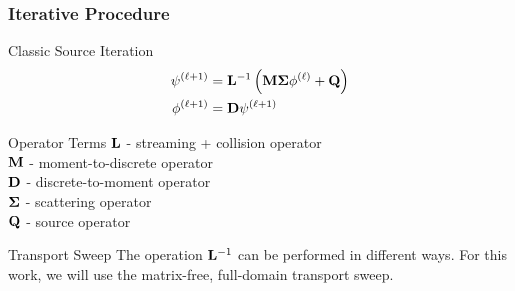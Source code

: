\documentclass[compress,10pt]{beamer}
\begin{document}
\typeout{***********************************************************************************}
\begin{frame}[t]\frametitle{Iterative Procedure}
\begin{block}{Classic Source Iteration} {\small
\begin{equation*}
\begin{aligned}
 \psi^{(\ell+1)} &= {\bf L}^{-1} \left( {\bf M} {\bf \Sigma} \phi^{(\ell)}  +  {\bf Q} \right) \\
\phi^{(\ell+1)} &= {\bf D}  \psi^{(\ell+1)}
\end{aligned}
\end{equation*}
}\end{block}
\begin{block}{Operator Terms} {\small
${\bf L}$ - streaming + collision operator \\
${\bf M}$ - moment-to-discrete operator \\
${\bf D}$ - discrete-to-moment operator \\
${\bf \Sigma}$ - scattering operator \\
${\bf Q}$ - source operator
}\end{block}
\begin{block}{Transport Sweep} {\small
The operation ${\bf L}^{-1}$ can be performed in different ways. For this work, we will use the matrix-free, full-domain transport sweep.
} \end{block}
\end{frame}
\typeout{***********************************************************************************}
\end{document}
